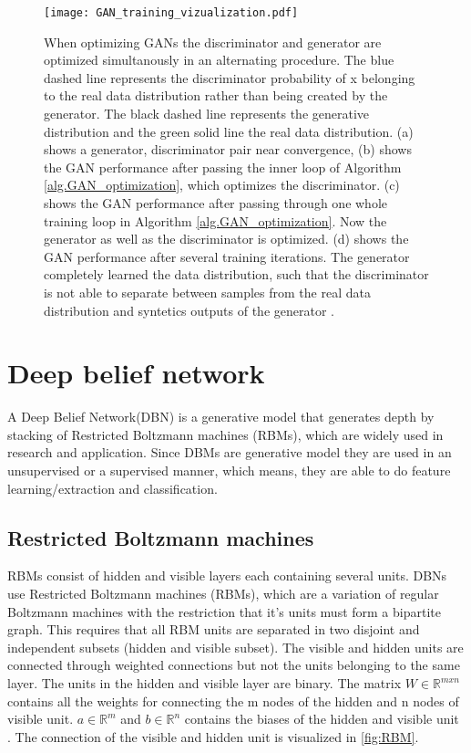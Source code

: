 \begin{figure}[p]
  \centering
  \texttt{[image: GAN\_training\_vizualization.pdf]}
  \caption{When optimizing GANs the discriminator and generator are optimized simultanously in an alternating procedure. The blue dashed line represents the discriminator probability of x belonging to the real data distribution rather than being created by the generator. The black dashed line represents the generative distribution and the green solid line the real data distribution. (a) shows a generator, discriminator pair near convergence, (b) shows the GAN performance after passing the inner loop of Algorithm \ref{alg.GAN_optimization}, which optimizes the discriminator. (c) shows the GAN performance after passing through one whole training loop in Algorithm \ref{alg.GAN_optimization}. Now the generator as well as the discriminator is optimized. (d) shows the GAN performance after several training iterations. The generator completely learned the data distribution, such that the discriminator is not able to separate between samples from the real data distribution and syntetics outputs of the generator \cite{Goodfellow2014}.}
  \label{fig:DCAN_model}
\end{figure}




\section{Deep belief network}

A Deep Belief Network(DBN) is a generative model that generates depth by stacking of Restricted Boltzmann machines (RBMs), which are widely used in research and application. Since DBMs are generative model they are used in an unsupervised or a supervised manner, which means, they are able to do feature learning/extraction and classification.

\subsection{Restricted Boltzmann machines}
RBMs consist of hidden and visible layers each containing several units. DBNs use Restricted Boltzmann machines (RBMs), which are a variation of regular Boltzmann machines with the restriction that it's units must form a bipartite graph. This requires that all RBM units are separated in two disjoint and independent subsets (hidden and visible subset). The visible and hidden units are connected through weighted connections but not the units belonging to the same layer. The units in the hidden and visible layer are binary. The matrix $W \in \mathbb{R}^{mxn}$ contains all the weights for connecting the m nodes of the hidden and n nodes of visible unit. $a \in \mathbb{R}^{m}$ and $b \in \mathbb{R}^{n}$ contains the biases of the hidden and visible unit \cite{Hinton2010}. The connection of the visible and hidden unit is visualized in \ref{fig:RBM}.

